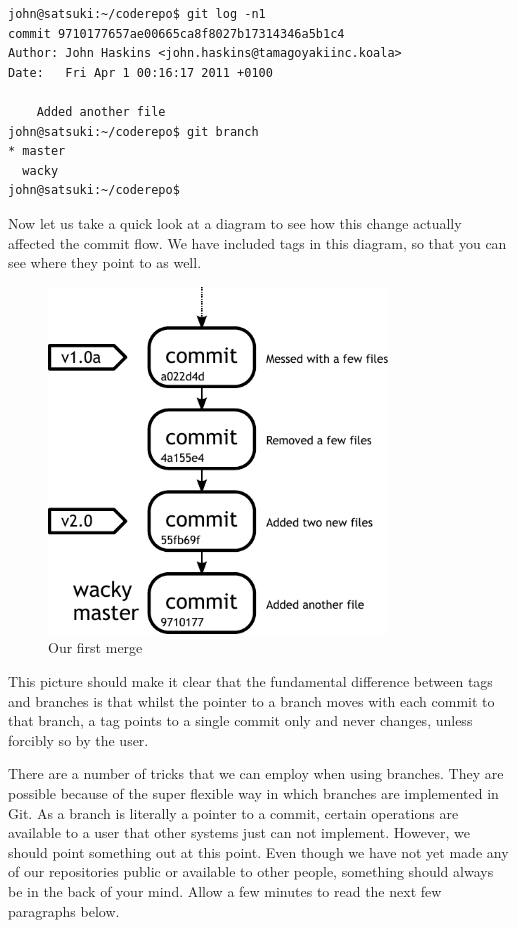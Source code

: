 \begin{Verbatim}
john@satsuki:~/coderepo$ git log -n1
commit 9710177657ae00665ca8f8027b17314346a5b1c4
Author: John Haskins <john.haskins@tamagoyakiinc.koala>
Date:   Fri Apr 1 00:16:17 2011 +0100

    Added another file
john@satsuki:~/coderepo$ git branch
* master
  wacky
john@satsuki:~/coderepo$
\end{Verbatim}

Now let us take a quick look at a diagram to see how this change actually affected the commit flow.
We have included tags in this diagram, so that you can see where they point to as well.

\begin{figure}[hbt]
\centering
\includegraphics[width=9cm]{images/f-w4-d2.pdf}
\caption{Our first merge}
\end{figure}

This picture should make it clear that the fundamental difference between tags and branches is that whilst the pointer to a branch moves with each commit to that branch, a tag points to a single commit only and never changes, unless forcibly so by the user.

There are a number of tricks that we can employ when using branches.
They are possible because of the super flexible way in which branches are implemented in Git.
As a branch is literally a pointer to a commit, certain operations are available to a user that other systems just can not implement.
However, we should point something out at this point.
Even though we have not yet made any of our repositories public or available to other people, something should always be in the back of your mind.
Allow a few minutes to read the next few paragraphs below.

